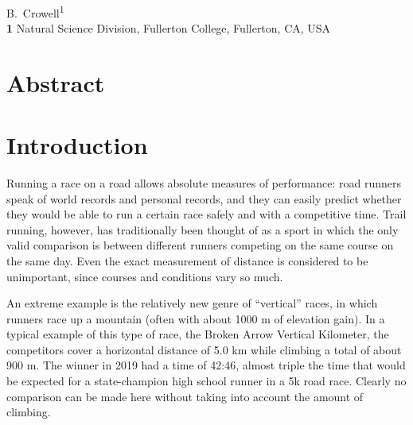 \documentclass[10pt,letterpaper]{article}
\begin{document}
\vspace*{0.2in}

\begin{flushleft}
{\Large
\textbf{} 
}
\newline
\\
B.~Crowell\textsuperscript{1}
\\
\bigskip
\textbf{1} Natural Science Division, Fullerton College, Fullerton, CA, USA\\
\bigskip

\end{flushleft}
\section*{Abstract}


\linenumbers


\section*{Introduction}
Running a race on a road allows absolute measures of performance:
road runners speak of world records and personal records, and they can
easily predict whether they would be able to run a certain race safely
and with a competitive time. Trail running, however, has traditionally
been thought of as a sport in which the only valid comparison is between
different runners competing on the same course on the same day. Even the
exact measurement of distance is considered to be unimportant, since courses
and conditions vary so much. 

An extreme example is the relatively new genre
of ``vertical'' races, in which runners race up a mountain (often with about
1000 m of elevation gain). In a typical example of this type of race, the Broken
Arrow Vertical Kilometer, the competitors cover a horizontal distance of 5.0 km
while climbing a total of about 900 m. The winner in 2019 had a time of 42:46,
almost triple the time that would be expected for a state-champion high school runner in
a 5k road race. Clearly no comparison can be made here without taking into account
the amount of climbing.
\end{document}
